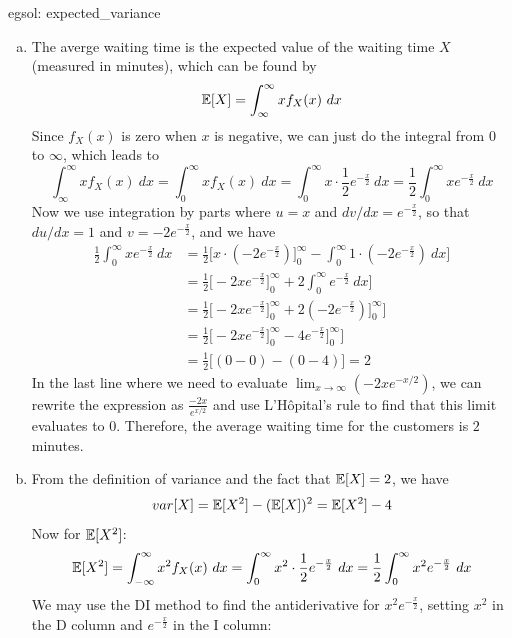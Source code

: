 \begin{egsol}[]{egsol: expected_variance}
    \begin{enumerate}[a)]
        \item The averge waiting time is the expected value of the waiting time $X$ (measured in minutes), which can be found by 
        \[\mathbb{E}[X] = \int_{\infty}^{\infty} xf_X(x)~dx\]
        Since $f_X(x)$ is zero when $x$ is negative, we can just do the integral from $0$ to $\infty$, which leads to
        \[\int_{\infty}^{\infty} xf_X(x)~dx = \int_0^{\infty} xf_X(x)~dx = \int_0^{\infty} x \cdot \frac{1}{2}e^{-\frac{x}{2}}~dx = \frac{1}{2}\int_0^\infty xe^{-\frac{x}{2}}~dx\]
        Now we use integration by parts where $u = x$ and $dv/dx = e^{-\frac{x}{2}}$, so that $du/dx = 1$ and $v = -2e^{-\frac{x}{2}}$, and we have
        \begin{align*}
            \frac{1}{2}\int_0^\infty xe^{-\frac{x}{2}}~dx &= \frac{1}{2}\Big[x \cdot (-2e^{-\frac{x}{2}})\big]_0^{\infty} - \int_0^\infty 1 \cdot (-2e^{-\frac{x}{2}}) ~dx \Big]\\
            &= \frac{1}{2}\Big[-2xe^{-\frac{x}{2}}\big]_0^{\infty} +2 \int_0^\infty e^{-\frac{x}{2}}~dx \Big]\\
            &= \frac{1}{2}\Big[-2xe^{-\frac{x}{2}}\big]_0^{\infty} +2 (-2e^{-\frac{x}{2}})\big]_0^\infty \Big]\\
            &= \frac{1}{2}\Big[-2xe^{-\frac{x}{2}}\big]_0^{\infty} -4 e^{-\frac{x}{2}}\big]_0^\infty \Big]\\
            &= \frac{1}{2}\Big[(0-0)-(0-4)\Big] = 2
        \end{align*}
        In the last line where we need to evaluate $\lim_{x \rightarrow \infty}(-2xe^{-x/2})$, we can rewrite the expression as $\frac{-2x}{e^{x/2}}$ and use L'Hôpital's rule to find that this limit evaluates to $0$.  Therefore, the average waiting time for the customers is $2$ minutes.
        \item From the definition of variance and the fact that $\mathbb{E}[X] = 2$, we have
        \[var[X] = \mathbb{E}[X^2] - (\mathbb{E}[X])^2 = \mathbb{E}[X^2] - 4\]
        Now for $\mathbb{E}[X^2]$:
        \[\mathbb{E}[X^2] = \int_{-\infty}^{\infty} x^2 f_X(x)~dx= \int_{0}^{\infty} x^2 \cdot \frac{1}{2}e^{-\frac{x}{2}}~dx = \frac{1}{2}\int_0^\infty x^2e^{-\frac{x}{2}}~dx\]
        We may use the DI method to find the antiderivative for $x^2e^{-\frac{x}{2}}$, setting $x^2$ in the D column and $e^{-\frac{x}{2}}$ in the I column:
        \begin{center}
            \begin{tabular}{ccc}

\end{tabular}
\end{center}
\end{enumerate}
\end{egsol}

